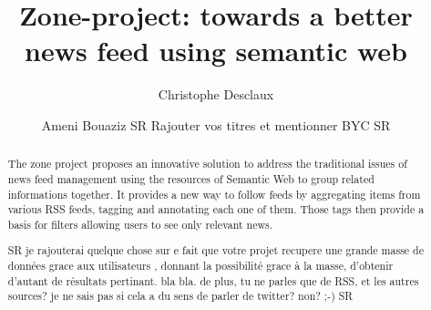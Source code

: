 \documentclass{llncs}
\begin{document}
%
\frontmatter          %
%
\pagestyle{headings}  %
%

\mainmatter              %
%
\title{Zone-project: towards a better news feed using semantic web}
%
%
\author{Christophe Desclaux\and Ameni Bouaziz   SR Rajouter vos titres et mentionner BYC SR}
%
%
%



\maketitle

\begin{abstract}%
The zone project proposes an innovative solution to address the traditional issues of news feed management using the resources of Semantic Web to group related informations together.
It provides a new way to follow feeds by aggregating items from various RSS feeds, tagging and annotating each one of them. Those tags then provide a basis for filters allowing users to see only relevant news.

SR 
je rajouterai quelque chose sur e fait que votre projet recupere une grande masse de données grace aux utilisateurs , donnant la possibilité grace à la masse, d'obtenir d'autant de résultats pertinant. bla bla.
de plus, tu ne parles que de RSS, et les autres sources? je ne sais pas si cela a du sens de parler de twitter? non? ;-) 
SR

{}
\end{abstract}
%
\end{document}
